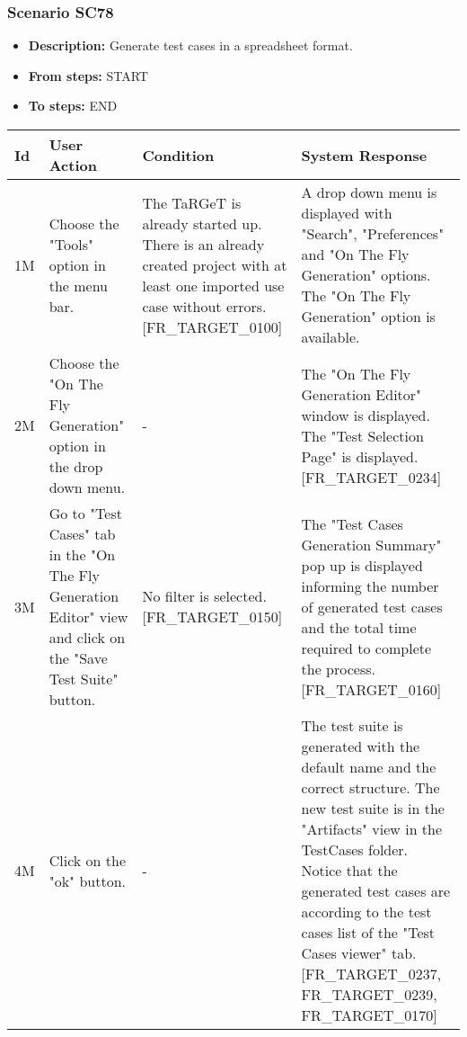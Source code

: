 \documentclass[a4paper,11pt]{article}
\newcommand{\bl}{\\ \hline}
\begin{document}
\subsubsection*{Scenario SC78}
\begin{itemize}
\item {\bf Description:} Generate test cases in a spreadsheet format.
				
\item {\bf From steps:} START
\item {\bf To steps:} END
\end{itemize}
\begin{tabular}{|p{0.4in}|p{1.5in}|p{1.5in}|p{1.5in}|}
\hline
Id & User Action & Condition & System Response \bl 
1M & Choose the "Tools" option in the menu bar.  & The TaRGeT is already started up. There is an already
						created project with at least one imported use case without
						errors. [FR_TARGET_0100] & A drop down menu is displayed with "Search",
						"Preferences" and "On The Fly Generation" options. The "On The Fly
						Generation" option is available. \bl
2M & Choose the "On The Fly Generation" option in the drop down
						menu. & - & The "On The Fly Generation Editor" window is displayed.
						The "Test Selection Page" is displayed. [FR_TARGET_0234]
					\bl
3M & Go to "Test Cases" tab in the "On The Fly Generation
						Editor" view and click on the "Save Test Suite" button. & No filter is selected. [FR_TARGET_0150] & The "Test Cases Generation Summary" pop up is displayed
						informing the number of generated test cases and the total time
						required to complete the process. [FR_TARGET_0160]\bl
4M & Click on the "ok" button. & - & The test suite is generated with the default name and the
						correct structure. The new test suite is in the "Artifacts" view
						in the TestCases folder. Notice that the generated test cases are
						according to the test cases list of the "Test Cases viewer" tab.
						[FR_TARGET_0237, FR_TARGET_0239, FR_TARGET_0170]\bl
\end{tabular}
\end{document}
